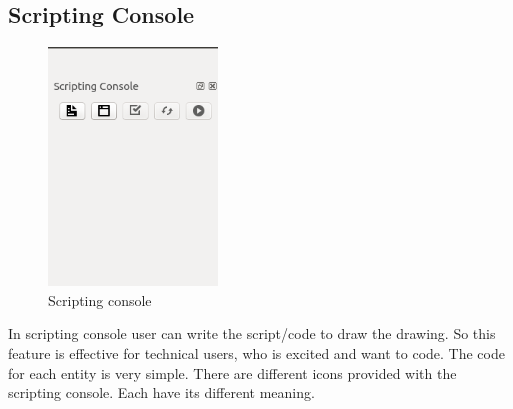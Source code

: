 \subsection{Scripting Console}
\begin{figure}[h!]
\centering
\includegraphics[width=0.4\textwidth]{images/scriptingconsole.png} 
\caption{Scripting console}
\end{figure}
In scripting console user can write the script/code to draw the drawing. So this feature is effective for technical users, who is excited and want to code. The code for each entity is very simple. There are different icons provided with the scripting console. Each have its different meaning.
